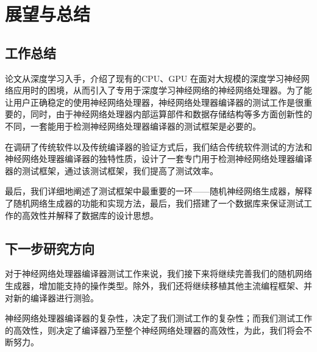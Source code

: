 ﻿\chapter{展望与总结}
\section{工作总结}
论文从深度学习入手，介绍了现有的CPU、GPU 在面对大规模的深度学习神经网络应用时的困境，从而引入了专用于深度学习神经网络的神经网络处理器。为了能让用户正确稳定的使用神经网络处理器，神经网络处理器编译器的测试工作是很重要的，同时，由于神经网络处理器内部运算部件和数据存储结构等多方面创新性的不同，一套能用于检测神经网络处理器编译器的测试框架是必要的。

在调研了传统软件以及传统编译器的验证方式后，我们结合传统软件测试的方法和神经网络处理器编译器的独特性质，设计了一套专门用于检测神经网络处理器编译器的测试框架，通过该测试框架，我们提高了测试效率。

最后，我们详细地阐述了测试框架中最重要的一环——随机神经网络生成器，解释了随机网络生成器的功能和实现方法，最后，我们搭建了一个数据库来保证测试工作的高效性并解释了数据库的设计思想。

\section{下一步研究方向}
对于神经网络处理器编译器测试工作来说，我们接下来将继续完善我们的随机网络生成器，增加能支持的操作类型。除外，我们还将继续移植其他主流编程框架、并对新的编译器进行测验。

神经网络处理器编译器的复杂性，决定了我们测试工作的复杂性；而我们测试工作的高效性，则决定了编译器乃至整个神经网络处理器的高效性，为此，我们将会不断努力。